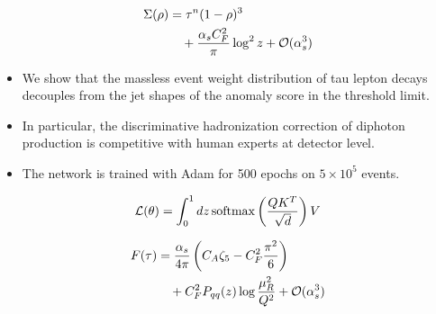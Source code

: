 \begin{align}
  \Sigma(\rho) &= {\tau}^{n} (1 - \rho)^{3} \nonumber \\
  &\quad + \frac{\alpha_s C_F^2}{\pi} \log^2 z + \mathcal{O}(\alpha_s^3) \label{eq:3}
\end{align}

\begin{itemize}
  \item We show that the massless event weight distribution of tau lepton decays decouples from the jet shapes of the anomaly score in the threshold limit.
  \item In particular, the discriminative hadronization correction of diphoton production is competitive with human experts at detector level.
  \item The network is trained with Adam for 500 epochs on $5 \times 10^5$ events.
\end{itemize}

\begin{equation}
  \mathcal{L}(\theta) = \int_0^1 dz \, \mathrm{softmax}\left(\frac{Q K^T}{\sqrt{d}}\right) V
  \label{eq:4}
\end{equation}

\begin{align}
  F(\tau) &= \frac{\alpha_s}{4\pi} \left( C_A \zeta_{5} - C_F^2 \frac{\pi^2}{6} \right) \nonumber \\
  &\quad + C_F^2 P_{qq}(z) \log\frac{\mu_R^2}{Q^2} + \mathcal{O}(\alpha_s^3) \label{eq:5}
\end{align}

